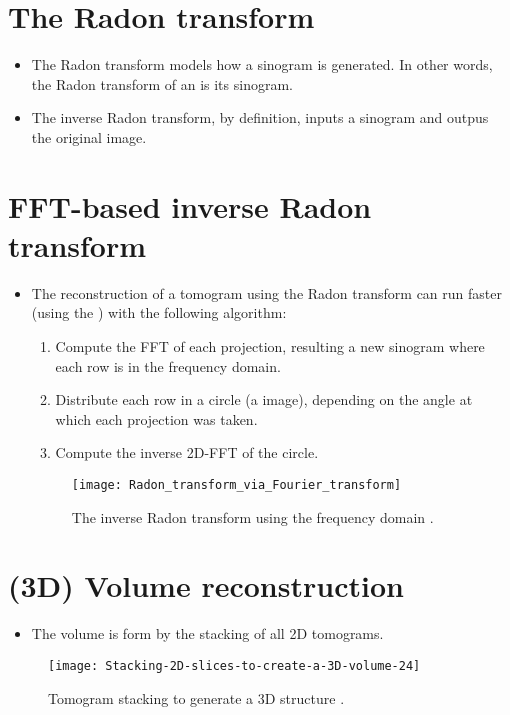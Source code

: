 \section{The Radon transform}
\begin{itemize}
\item The Radon transform models how a sinogram is generated. In other
  words, the Radon transform of an  is
  its sinogram.
\item The inverse Radon transform, by definition, inputs a sinogram
  and outpus the original image.
\end{itemize}

\section{FFT-based inverse Radon transform}
\begin{itemize}
\item The reconstruction of a tomogram using the Radon transform can
  run faster (using the ) with the following algorithm:
  \begin{enumerate}
  \item Compute the FFT of each projection, resulting a new sinogram
    where each row is in the frequency domain.
  \item Distribute each row in a circle (a image), depending on the
    angle at which each projection was taken.
  \item Compute the inverse 2D-FFT of the circle.
  \end{enumerate}
  \begin{figure}[H]
    \vspace{-1ex}
    \centering
    \texttt{[image: Radon\_transform\_via\_Fourier\_transform]}
    \caption{The inverse Radon transform using the frequency domain
      \cite{wikipedia2025radom_transform}.\label{fig:inverse_Radon}}
  \end{figure}
\end{itemize}

\section{(3D) Volume reconstruction}
\begin{itemize}
\item The volume is form by the stacking of all 2D tomograms.
\end{itemize}
\vspace{-1ex}
\begin{figure}[H]
  \centering
  \texttt{[image: Stacking-2D-slices-to-create-a-3D-volume-24]}
  \caption{Tomogram stacking to generate a 3D structure
    \cite{alzu2019multi}.\label{fig:stacking}}
\end{figure}

